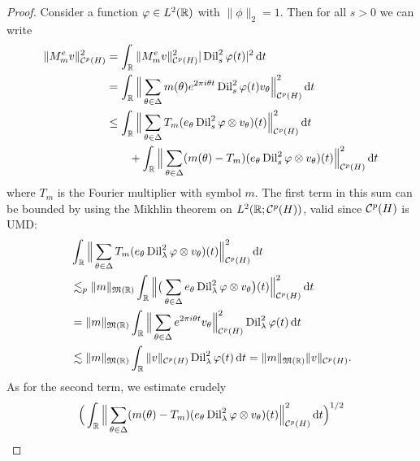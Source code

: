 \begin{proof}
 Consider a function $\varphi \in L^2(\mathbb{R})$ with $\|\phi\|_{2} = 1$.
 Then for all $s > 0$ we can write
 \begin{equation*}
   \begin{aligned}
     \| M_{m}^{e} v \|_{\mathcal{C}^{p}(H)}^{2}
     &= \int_{\mathbb{R}} \|M_{m}^{e} v \|_{\mathcal{C}^{p}(H)}^{2} |\operatorname{Dil}^{2}_{s} \varphi(t)|^{2} \, \mathrm{d} t \\
     &= \int_{\mathbb{R}} \Big\| \sum_{\theta \in \Delta} m(\theta) e^{2\pi i \theta t} \operatorname{Dil}_{s}^{2} \varphi(t) v_{\theta} \Big\|_{\mathcal{C}^{p}(H)}^{2} \, \mathrm{d} t \\
     &\leq \int_{\mathbb{R}} \Big\| \sum_{\theta \in \Delta} T_{m} (e_{\theta} \operatorname{Dil}_{s}^{2} \varphi \otimes v_{\theta})(t) \Big\|_{\mathcal{C}^{p}(H)}^{2}  \, \mathrm{d} t \\
     &\qquad + \int_{\mathbb{R}} \Big\| \sum_{\theta \in \Delta} (m(\theta) - T_{m}) (e_{\theta} \operatorname{Dil}_{s}^{2} \varphi \otimes v_{\theta})(t) \Big\|_{\mathcal{C}^{p}(H)}^{2}  \, \mathrm{d} t
   \end{aligned}
 \end{equation*}
  where $T_{m}$ is the Fourier multiplier with symbol $m$.
  The first term in this sum can be bounded by using the Mikhlin theorem on $L^2(\mathbb{R};\mathcal{C}^{p}(H))$, valid since $\mathcal{C}^{p}(H)$ is UMD:
  \begin{equation*}
    \begin{aligned}
      &\int_{\mathbb{R}} \Big\| \sum_{\theta \in \Delta} T_{m} (e_{\theta} \operatorname{Dil}_{\lambda}^{2} \varphi \otimes v_{\theta})(t) \Big\|_{\mathcal{C}^{p}(H)}^{2}  \, \mathrm{d} t \\
      &\lesssim_{p} \|m\|_{\mathfrak{M}(\mathbb{R})} \int_{\mathbb{R}} \Big\| \big( \sum_{\theta \in \Delta} e_{\theta} \operatorname{Dil}_{\lambda}^{2} \varphi \otimes v_{\theta} \big)(t) \Big\|_{\mathcal{C}^{p}(H)}^{2}  \, \mathrm{d} t \\
      &= \|m\|_{\mathfrak{M}(\mathbb{R})} \int_{\mathbb{R}} \Big\| \sum_{\theta \in \Delta} e^{2\pi i \theta t}  v_{\theta} \Big\|_{\mathcal{C}^{p}(H)}^{2} \operatorname{Dil}_{\lambda}^{2} \varphi(t) \, \mathrm{d} t \\
      &\lesssim \|m\|_{\mathfrak{M}(\mathbb{R})} \int_{\mathbb{R}} \|v\|_{\mathcal{C}^{p}(H)} \operatorname{Dil}_{\lambda}^{2} \varphi(t) \, \mathrm{d} t
      = \|m\|_{\mathfrak{M}(\mathbb{R})} \|v\|_{\mathcal{C}^{p}(H)}.
    \end{aligned}
  \end{equation*} 
  As for the second term, we estimate crudely
  \begin{equation*}
    \begin{aligned}
      &\Big(\int_{\R} \Big\| \sum_{\theta \in \Delta} (m(\theta) - T_{m}) (e_{\theta} \Dil_{\lambda}^{2} \phi \otimes v_{\theta})(t) \Big\|_{\mc{C}^{p}(H)}^{2}  \, \dd t \Big)^{1/2} \\

\end{aligned}
\end{equation*}
\end{proof}
